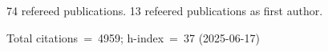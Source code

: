 74 refereed publications. 13 refeered publications as first author.

Total citations~=~4959; h-index~=~37 (2025-06-17)